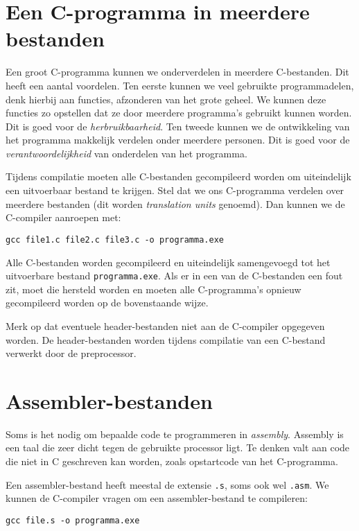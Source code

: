 \section{Een C-programma in meerdere bestanden}
Een groot C-programma kunnen we onderverdelen in meerdere C-bestanden. Dit heeft een aantal voordelen. Ten eerste kunnen we veel gebruikte programmadelen, denk hierbij aan functies, afzonderen van het grote geheel. We kunnen deze functies zo opstellen dat ze door meerdere programma's gebruikt kunnen worden. Dit is goed voor de \textsl{herbruikbaarheid}. Ten tweede kunnen we de ontwikkeling van het programma makkelijk verdelen onder meerdere personen. Dit is goed voor de \textsl{verantwoordelijkheid} van onderdelen van het programma. 

Tijdens compilatie moeten alle C-bestanden gecompileerd worden om uiteindelijk een uitvoerbaar bestand te krijgen. Stel dat we ons C-programma verdelen over meerdere bestanden (dit worden \textsl{translation units} genoemd). Dan kunnen we de C-compiler aanroepen met:

\hspace*{1em}\texttt{gcc file1.c file2.c file3.c -o programma.exe}

Alle C-bestanden worden gecompileerd en uiteindelijk samengevoegd tot het uitvoerbare bestand \texttt{programma.exe}.
Als er in een van de C-bestanden een fout zit, moet die hersteld worden en moeten alle C-programma's opnieuw gecompileerd worden op de bovenstaande wijze.

Merk op dat eventuele header-bestanden niet aan de C-compiler opgegeven worden. De header-bestanden worden tijdens compilatie van een C-bestand verwerkt door de preprocessor.

\section{Assembler-bestanden}
Soms is het nodig om bepaalde code te programmeren in \textit{assembly}. Assembly is een taal die zeer dicht tegen de gebruikte processor ligt. Te denken valt aan code die niet in C geschreven kan worden, zoals opstartcode van het C-programma.

Een assembler-bestand heeft meestal de extensie \texttt{.s}, soms ook wel \texttt{.asm}. We kunnen de C-compiler vragen om een assembler-bestand te compileren:

\hspace*{1em}\texttt{gcc file.s -o programma.exe}

